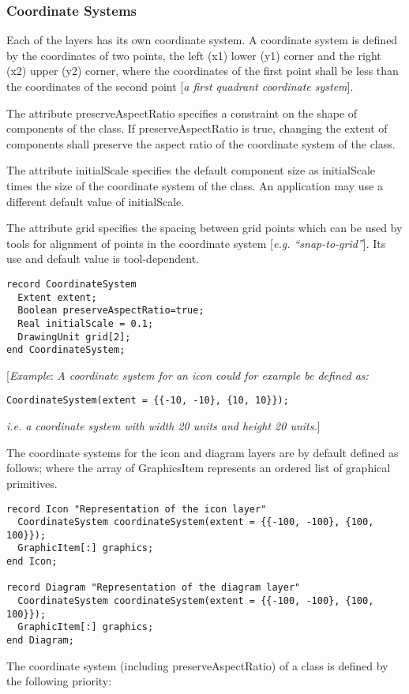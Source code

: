 \subsubsection{Coordinate Systems}

Each of the layers has its own coordinate system. A coordinate system is
defined by the coordinates of two points, the left (x1) lower (y1)
corner and the right (x2) upper (y2) corner, where the coordinates of
the first point shall be less than the coordinates of the second point
{[}\emph{a first quadrant coordinate system}{]}.

The attribute preserveAspectRatio specifies a constraint on the shape of
components of the class. If preserveAspectRatio is true, changing the
extent of components shall preserve the aspect ratio of the coordinate
system of the class.

The attribute initialScale specifies the default component size as
initialScale times the size of the coordinate system of the class. An
application may use a different default value of initialScale.

The attribute grid specifies the spacing between grid points which can
be used by tools for alignment of points in the coordinate system
{[}\emph{e.g. ``snap-to-grid''}{]}. Its use and default value is
tool-dependent.

\begin{lstlisting}[language=modelica]
record CoordinateSystem
  Extent extent;
  Boolean preserveAspectRatio=true;
  Real initialScale = 0.1;
  DrawingUnit grid[2];
end CoordinateSystem;
\end{lstlisting}
{[}\emph{Example}: \emph{A coordinate system for an icon could for
example be defined as:}
\begin{lstlisting}[language=modelica]
CoordinateSystem(extent = {{-10, -10}, {10, 10}});
\end{lstlisting}
\emph{i.e. a coordinate system with width 20 units and height 20
units.}{]}

The coordinate systems for the icon and diagram layers are by default
defined as follows; where the array of GraphicsItem represents an
ordered list of graphical primitives.

\begin{lstlisting}[language=modelica]
record Icon "Representation of the icon layer"
  CoordinateSystem coordinateSystem(extent = {{-100, -100}, {100, 100}});
  GraphicItem[:] graphics;
end Icon;

record Diagram "Representation of the diagram layer"
  CoordinateSystem coordinateSystem(extent = {{-100, -100}, {100, 100}});
  GraphicItem[:] graphics;
end Diagram;
\end{lstlisting}
The coordinate system (including preserveAspectRatio) of a class is
defined by the following priority:

